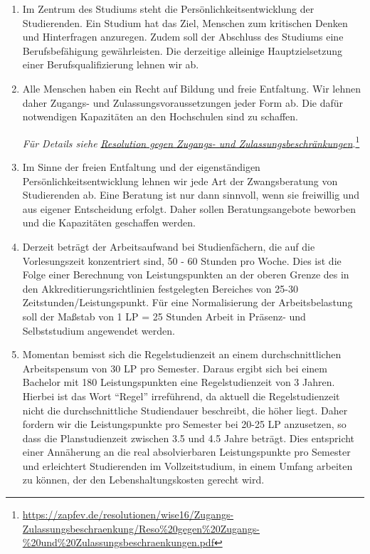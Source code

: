 \documentclass[DIV=calc]{scrartcl}
\newcommand{\okay}[1]{
    \textcolor{black}{#1}
}
\begin{document}
\begin{enumerate}
\def\labelenumi{\arabic{enumi})}

\item Im Zentrum des Studiums steht die Persönlichkeitsentwicklung der Studierenden. Ein Studium hat das Ziel, Menschen zum kritischen Denken und Hinterfragen anzuregen. Zudem soll der Abschluss des Studiums eine Berufsbefähigung gewährleisten. Die derzeitige \okay{alleinige} Hauptzielsetzung einer Berufsqualifizierung lehnen wir ab.

\item Alle Menschen haben ein Recht auf Bildung und freie Entfaltung. Wir lehnen daher Zugangs- und Zulassungsvoraussetzungen jeder Form ab. Die dafür notwendigen Kapazitäten an den Hochschulen sind zu schaffen.

 \emph{Für Details siehe
 }\href{https://zapfev.de/resolutionen/wise16/Zugangs-Zulassungsbeschraenkung/Reso\%20gegen\%20Zugangs-\%20und\%20Zulassungsbeschraenkungen.pdf}{\emph{Resolution
     gegen Zugangs- und Zulassungsbeschränkungen}}.\footnote{\url{https://zapfev.de/resolutionen/wise16/Zugangs-Zulassungsbeschraenkung/Reso\%20gegen\%20Zugangs-\%20und\%20Zulassungsbeschraenkungen.pdf}}
  
\item Im Sinne der freien Entfaltung und der eigenständigen Persönlichkeitsentwicklung lehnen wir jede Art der Zwangsberatung von Studierenden ab. Eine Beratung ist nur dann sinnvoll, wenn sie freiwillig und aus eigener Entscheidung erfolgt. Daher sollen Beratungsangebote beworben %
  und die Kapazitäten geschaffen werden.

\item Derzeit beträgt der Arbeitsaufwand%
  bei Studienfächern, die auf die Vorlesungszeit konzentriert sind, 50 - 60 Stunden pro Woche. Dies ist die Folge einer Berechnung von Leistungspunkten an der oberen Grenze des in den Akkreditierungsrichtlinien festgelegten Bereiches von 25-30 Zeitstunden/Leistungspunkt. Für eine Normalisierung der Arbeitsbelastung soll der Maßstab von 1 LP = 25 Stunden Arbeit in Präsenz- und Selbststudium angewendet werden.

\item Momentan bemisst sich die Regelstudienzeit an einem durchschnittlichen Arbeitspensum von 30 LP pro Semester. Daraus ergibt sich bei einem Bachelor mit 180 Leistungspunkten eine Regelstudienzeit von 3 Jahren. Hierbei ist das Wort \enquote{Regel} irreführend, da aktuell die Regelstudienzeit nicht die durchschnittliche Studiendauer beschreibt, die höher liegt. Daher fordern wir die Leistungspunkte pro Semester bei 20-25 LP anzusetzen, so dass die Planstudienzeit zwischen 3.5 und 4.5 Jahre beträgt. Dies entspricht einer Annäherung an die real absolvierbaren Leistungspunkte pro Semester und erleichtert Studierenden im Vollzeitstudium, in einem Umfang arbeiten zu können, der den Lebenshaltungskosten gerecht wird.


\end{enumerate}
\end{document}

